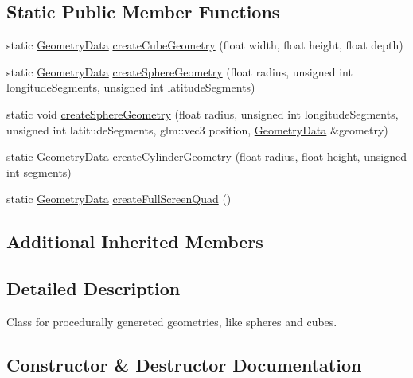 \subsection*{Static Public Member Functions}
\begin{DoxyCompactItemize}
\item 
static \mbox{\hyperlink{struct_geometry_data}{Geometry\+Data}} \mbox{\hyperlink{class_procedural_geometry_a640ac76e0dd9de37fd2025ac7e3667fc}{create\+Cube\+Geometry}} (float width, float height, float depth)
\item 
static \mbox{\hyperlink{struct_geometry_data}{Geometry\+Data}} \mbox{\hyperlink{class_procedural_geometry_a86aa1b10c06ae770bce69d5d48a54c47}{create\+Sphere\+Geometry}} (float radius, unsigned int longitude\+Segments, unsigned int latitude\+Segments)
\item 
static void \mbox{\hyperlink{class_procedural_geometry_a7cbbd9f84b647754d571f10934da8f49}{create\+Sphere\+Geometry}} (float radius, unsigned int longitude\+Segments, unsigned int latitude\+Segments, glm\+::vec3 position, \mbox{\hyperlink{struct_geometry_data}{Geometry\+Data}} \&geometry)
\item 
static \mbox{\hyperlink{struct_geometry_data}{Geometry\+Data}} \mbox{\hyperlink{class_procedural_geometry_a2d8786dba5064c14c73f2e3fafccd2ac}{create\+Cylinder\+Geometry}} (float radius, float height, unsigned int segments)
\item 
static \mbox{\hyperlink{struct_geometry_data}{Geometry\+Data}} \mbox{\hyperlink{class_procedural_geometry_ad2ad8b1fd1b3630cc1fcd4646270421c}{create\+Full\+Screen\+Quad}} ()
\end{DoxyCompactItemize}
\subsection*{Additional Inherited Members}


\subsection{Detailed Description}
Class for procedurally genereted geometries, like spheres and cubes. 



\subsection{Constructor \& Destructor Documentation}
\mbox{\label{class_procedural_geometry_a30248690322b0e29f013e3e832338dd0}} 
